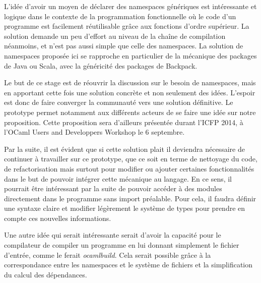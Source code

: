 \documentclass[11pt,a4paper]{report}
\begin{document}
L'idée d'avoir un moyen de déclarer des namespaces génériques est intéressante
et logique dans le contexte de la programmation fonctionnelle où le code d'un
programme est facilement réutilisable grâce aux fonctions d'ordre supérieur. La
solution demande un peu d'effort au niveau de la chaîne de compilation
néanmoins, et n'est pas aussi simple que celle des namespaces. La solution de
namespaces proposée ici se rapproche en particulier de la mécanique des packages
de Java ou Scala, avec la généricité des packages de Backpack.

Le but de ce stage est de réouvrir la discussion sur le besoin de namespaces,
mais en apportant cette fois une solution concrète et non seulement des
idées. L'espoir est donc de faire converger la communauté vers une solution
définitive. Le prototype permet notamment aux différents acteurs de se faire une
idée sur notre proposition. Cette proposition sera d'ailleurs présentée durant
l'ICFP 2014, à l'OCaml Users and Developpers Workshop le 6 septembre.

Par la suite, il est évident que si cette solution plait il deviendra nécessaire
de continuer à travailler sur ce prototype, que ce soit en terme de nettoyage du
code, de refactorisation mais surtout pour modifier ou ajouter certaines
fonctionnalités dans le but de pouvoir intégrer cette mécanique au langage. En
ce sens, il pourrait être intéressant par la suite de pouvoir accéder à des
modules directement dans le programme sans import préalable. Pour cela, il
faudra définir une syntaxe claire et modifier légèrement le système de types
pour prendre en compte ces nouvelles informations.

Une autre idée qui serait intéressante serait d'avoir la capacité pour le
compilateur de compiler un programme en lui donnant simplement le fichier
d'entrée, comme le ferait \emph{ocamlbuild}. Cela serait possible grâce à la
correspondance entre les namespaces et le système de fichiers et la
simplification du calcul des dépendances.



\end{document}
